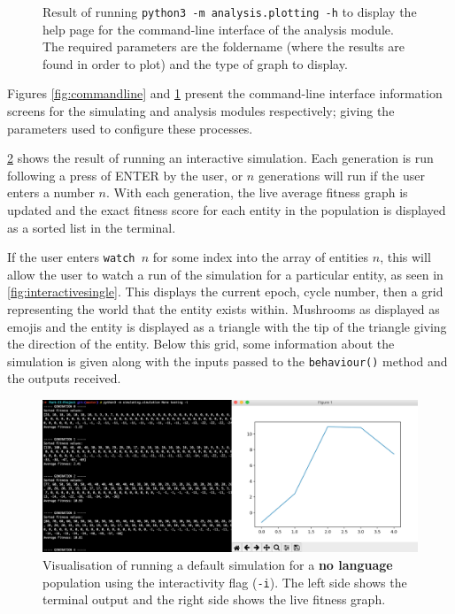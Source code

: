 \documentclass[12pt,a4paper]{report}
\begin{document}
\begin{figure}[t]
\begin{minipage}{0.49\textwidth}
          \caption{Result of running \texttt{python3 -m analysis.plotting -h} to display the help page for the command-line interface of the analysis module. The required parameters are the foldername (where the results are found in order to plot) and the type of graph to display.}
      \label{fig:commandline2}
   \end{minipage}
\end{figure}

Figures \ref{fig:commandline} and \ref{fig:commandline2} present the command-line interface information screens for the simulating and analysis modules respectively; giving the parameters used to configure these processes.

\cref{fig:interactive} shows the result of running an interactive simulation. Each generation is run following a press of ENTER by the user, or $n$ generations will run if the user enters a number $n$. With each generation, the live average fitness graph is updated and the exact fitness score for each entity in the population is displayed as a sorted list in the terminal.

If the user enters \texttt{watch $n$} for some index into the array of entities $n$, this will allow the user to watch a run of the simulation for a particular entity, as seen in \cref{fig:interactivesingle}. This displays the current epoch, cycle number, then a grid representing the world that the entity exists within. Mushrooms as displayed as emojis and the entity is displayed as a triangle with the tip of the triangle giving the direction of the entity. Below this grid, some information about the simulation is given along with the inputs passed to the \texttt{behaviour()} method and the outputs received.

\begin{figure}[ht]
  \centering
  \includegraphics[width=.9\linewidth]{figs/interactive}
  \caption{Visualisation of running a default simulation for a {\bf no language} population using the interactivity flag (\texttt{-i}). The left side shows the terminal output and the right side shows the live fitness graph.}
  \label{fig:interactive}
\end{figure}
\end{document}
